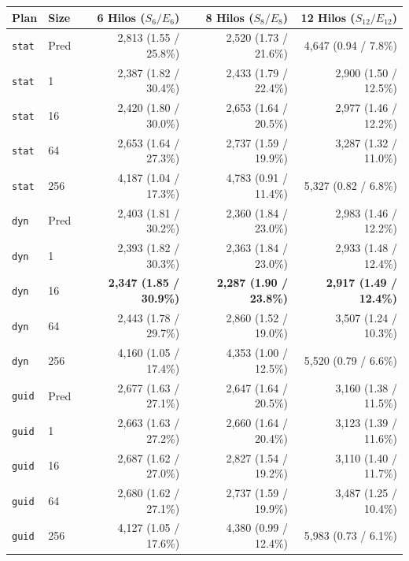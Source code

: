 \documentclass[12pt]{article}
\begin{document}
\begin{enumerate}
\begin{table}[htbp]
    \centering
    \small
    \begin{tabular}{llrrr}
        \toprule
        \textbf{Plan} & \textbf{Size} & \textbf{6 Hilos ($S_6 / E_6$)} & \textbf{8 Hilos ($S_8 / E_8$)} & \textbf{12 Hilos ($S_{12} / E_{12}$)} \\
        \midrule
        \texttt{stat} & Pred & 2,813 (1.55 / 25.8\%) & 2,520 (1.73 / 21.6\%) & 4,647 (0.94 / 7.8\%) \\
        \texttt{stat} & 1    & 2,387 (1.82 / 30.4\%) & 2,433 (1.79 / 22.4\%) & 2,900 (1.50 / 12.5\%) \\
        \texttt{stat} & 16   & 2,420 (1.80 / 30.0\%) & 2,653 (1.64 / 20.5\%) & 2,977 (1.46 / 12.2\%) \\
        \texttt{stat} & 64   & 2,653 (1.64 / 27.3\%) & 2,737 (1.59 / 19.9\%) & 3,287 (1.32 / 11.0\%) \\
        \texttt{stat} & 256  & 4,187 (1.04 / 17.3\%) & 4,783 (0.91 / 11.4\%) & 5,327 (0.82 / 6.8\%) \\
        \midrule
        \texttt{dyn} & Pred  & 2,403 (1.81 / 30.2\%) & 2,360 (1.84 / 23.0\%) & 2,983 (1.46 / 12.2\%) \\
        \texttt{dyn} & 1     & 2,393 (1.82 / 30.3\%) & 2,363 (1.84 / 23.0\%) & 2,933 (1.48 / 12.4\%) \\
        \texttt{dyn} & 16    & \textbf{2,347 (1.85 / 30.9\%)} & \textbf{2,287 (1.90 / 23.8\%)} & \textbf{2,917 (1.49 / 12.4\%)} \\
        \texttt{dyn} & 64    & 2,443 (1.78 / 29.7\%) & 2,860 (1.52 / 19.0\%) & 3,507 (1.24 / 10.3\%) \\
        \texttt{dyn} & 256   & 4,160 (1.05 / 17.4\%) & 4,353 (1.00 / 12.5\%) & 5,520 (0.79 / 6.6\%) \\
        \midrule
        \texttt{guid} & Pred & 2,677 (1.63 / 27.1\%) & 2,647 (1.64 / 20.5\%) & 3,160 (1.38 / 11.5\%) \\
        \texttt{guid} & 1    & 2,663 (1.63 / 27.2\%) & 2,660 (1.64 / 20.4\%) & 3,123 (1.39 / 11.6\%) \\
        \texttt{guid} & 16   & 2,687 (1.62 / 27.0\%) & 2,827 (1.54 / 19.2\%) & 3,110 (1.40 / 11.7\%) \\
        \texttt{guid} & 64   & 2,680 (1.62 / 27.1\%) & 2,737 (1.59 / 19.9\%) & 3,487 (1.25 / 10.4\%) \\
        \texttt{guid} & 256  & 4,127 (1.05 / 17.6\%) & 4,380 (0.99 / 12.4\%) & 5,983 (0.73 / 6.1\%) \\
        \bottomrule

\end{tabular}
\end{table}
\end{enumerate}
\end{document}
